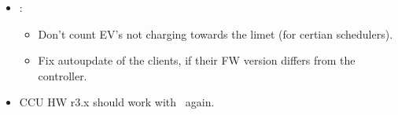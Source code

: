 \documentclass{scrartcl}
\begin{document}
\begin{itemize}
\begin{itemize}
  \item Correctly handle reject and pending in BootNotification.conf.
  \item Ensure ordering af Authorize.req after a RemoteStarteTransaction.req.
  \end{itemize}
\item \nanogrid:
  \begin{itemize}
  \item Don't count EV's not charging towards the limet (for certian
    schedulers).
  \item Fix autoupdate of the clients, if their FW version differs from the controller.
  \end{itemize}
\item CCU HW r3.x should work with \nanogrid\ again.
\end{itemize}
\end{document}
